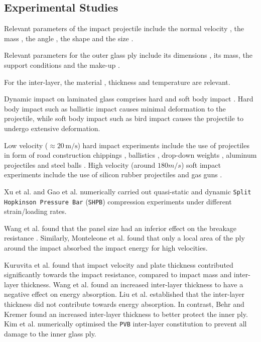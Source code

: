 \documentclass[format=acmtog, 12pt, screen=true, review=false]{acmart}
\begin{document}
\subsection{Experimental Studies}

Relevant parameters of the impact projectile include the normal velocity \cite{Gra98, Kur14, Dar13, Wu14}, the mass \cite{Kur14, Dar13}, the angle \cite{Gra98, Kur14, Dar13}, the shape \cite{Dar13} and the size \cite{Wu14}.

\bigbreak
Relevant parameters for the outer glass ply include its dimensions \cite{Wan18}, its mass, the support conditions \cite{Wan18} and the make-up \cite{Wan18}.

\bigbreak
For the inter-layer, the material \cite{Moh18, Wan18, Mon04}, thickness \cite{Ji98, Kur14, Wan18} and temperature \cite{Moh18, Zha19} are relevant.

\bigbreak
Dynamic impact on laminated glass comprises hard and soft body impact \cite{Moh17}. Hard body impact such as ballistic impact \cite{Bra10} causes minimal deformation to the projectile, while soft body impact such as bird impact \cite{Moh17} causes the projectile to undergo extensive deformation.

\bigbreak
Low velocity ($\approx 20\,\mathrm{m}/\mathrm{s}$) hard impact experiments include the use of projectiles in form of road construction chippings \cite{Gra98}, ballistics \cite{Mon04}, drop-down weights \cite{Che15, Mil12, Wan18}, aluminum projectiles \cite{Mil12} and steel balls \cite{Beh99, Flo98, Wan18}. High velocity (around $180 m/s$) soft impact experiments include the use of silicon rubber projectiles \cite{Moh17} and gas guns \cite{Moh18}.

\bigbreak
Xu et al. \cite{Xu11} and Gao et al. \cite{Gao14} numerically carried out quasi-static and dynamic \texttt{Split Hopkinson Pressure Bar} (\texttt{SHPB}) compression experiments under different strain/loading rates. 

\bigbreak
Wang et al. \cite{Wan18} found that the panel size had an inferior effect on the breakage resistance \cite{Wan18}. Similarly, Monteleone et al. \cite{Mon04} found that only a local area of the ply around the impact absorbed the impact energy for high velocities.

\bigbreak
Kuruvita et al. \cite{Kur14} found that impact velocity and plate thickness contributed significantly towards the impact resistance, compared to impact mass and inter-layer thickness. Wang et al. \cite{Wan18} found an increased inter-layer thickness to have a negative effect on energy absorption. Liu et al. \cite{Liu16} established that the inter-layer thickness did not contribute towards energy absorption. In contrast, Behr and Kremer \cite{Beh99} found an increased inter-layer thickness to better protect the inner ply. Kim et al. \cite{Kim16} numerically optimised the \texttt{PVB} inter-layer constitution to prevent all damage to the inner glass ply.
\end{document}
